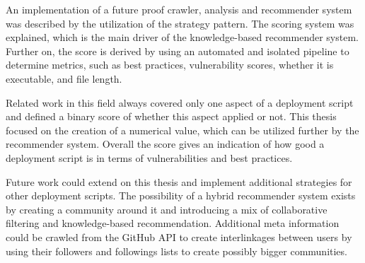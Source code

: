 An implementation of a future proof crawler, analysis and recommender system was described by the utilization of the strategy pattern.
The scoring system was explained, which is the main driver of the knowledge-based recommender system. Further on, the score is derived by using an automated and isolated pipeline to determine metrics, such as best practices, vulnerability scores, whether it is executable, and file length.

Related work in this field always covered only one aspect of a deployment script and defined a binary score of whether this aspect applied or not. This thesis focused on the creation of a numerical value, which can be utilized further by the recommender system.
Overall the score gives an indication of how good a deployment script is in terms of vulnerabilities and best practices.

Future work could extend on this thesis and implement additional strategies for other deployment scripts. The possibility of a hybrid recommender system exists by creating a community around it and introducing a mix of collaborative filtering and knowledge-based recommendation. Additional meta information could be crawled from the GitHub API to create interlinkages between users by using their followers and followings lists to create possibly bigger communities.


